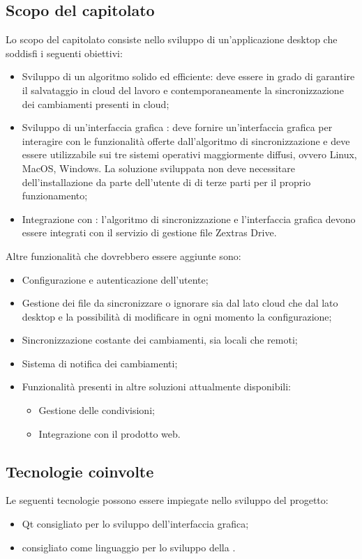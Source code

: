 \subsection{Scopo del capitolato}
Lo scopo del capitolato consiste nello sviluppo di un'applicazione desktop che soddisfi i seguenti obiettivi:
\begin{itemize}
	\item Sviluppo di un algoritmo solido ed efficiente: deve essere in grado di garantire il salvataggio in cloud del lavoro e contemporaneamente la sincronizzazione dei cambiamenti presenti in cloud;
	\item Sviluppo di un’interfaccia grafica : deve fornire un'interfaccia grafica per interagire con le funzionalità offerte dall'algoritmo di sincronizzazione e deve essere utilizzabile sui tre sistemi operativi maggiormente diffusi, ovvero Linux, MacOS, Windows. La soluzione sviluppata non deve necessitare dell'installazione da parte dell'utente di  di terze parti per il proprio funzionamento;
	\item Integrazione con : l'algoritmo di sincronizzazione e l'interfaccia grafica devono essere integrati con il servizio di gestione file Zextras Drive.
\end{itemize}
Altre funzionalità che dovrebbero essere aggiunte sono:
\begin{itemize}
	\item Configurazione e autenticazione dell'utente;
	\item Gestione dei file da sincronizzare o ignorare sia dal lato cloud che dal lato desktop e la possibilità di modificare in ogni momento la configurazione;
	\item Sincronizzazione costante dei cambiamenti, sia locali che remoti;
	\item Sistema di notifica dei cambiamenti;
	\item Funzionalità presenti in altre soluzioni attualmente disponibili:
	\begin{itemize}
		\item Gestione delle condivisioni;
		\item Integrazione con il prodotto web.
	\end{itemize}
\end{itemize}

\subsection{Tecnologie coinvolte}
Le seguenti tecnologie possono essere impiegate nello sviluppo del progetto:
\begin{itemize}
	\item {} Qt consigliato per lo sviluppo dell'interfaccia grafica;
	\item {} consigliato come linguaggio per lo sviluppo della .
\end{itemize}


